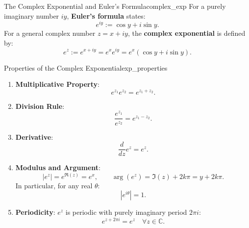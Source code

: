 \begin{definition}{The Complex Exponential and Euler's Formula}{complex_exp}
For a purely imaginary number $iy$, \textbf{Euler's formula} states:
\begin{equation}
e^{iy} := \cos y + i \sin y.
\end{equation}
For a general complex number $z = x + iy$, the \textbf{complex exponential} is defined by:
\begin{equation}
e^z := e^{x+iy} = e^x e^{iy} = e^x (\cos y + i \sin y).
\end{equation}
\end{definition}

\begin{proposition}{Properties of the Complex Exponential}{exp_properties}
\begin{enumerate}
    \item \textbf{Multiplicative Property}:
    \begin{equation}
    e^{z_1} e^{z_2} = e^{z_1 + z_2}.
    \end{equation}
    \item \textbf{Division Rule}:
    \begin{equation}
    \frac{e^{z_1}}{e^{z_2}} = e^{z_1 - z_2}.
    \end{equation}
    \item \textbf{Derivative}:
    \begin{equation}
    \frac{d}{dz} e^z = e^z.
    \end{equation}
    \item \textbf{Modulus and Argument}:
    \begin{equation}
    |e^z| = e^{\Re(z)} = e^x, \qquad \arg(e^z) = \Im(z) + 2k\pi = y + 2k\pi.
    \end{equation}
    In particular, for any real $\theta$:
    \begin{equation}
    |e^{i\theta}| = 1.
    \end{equation}
    \item \textbf{Periodicity}: $e^z$ is periodic with purely imaginary period $2\pi i$:
    \begin{equation}
    e^{z + 2\pi i} = e^z \quad \forall z \in \mathbb{C}.
    \end{equation}
\end{enumerate}
\end{proposition}

